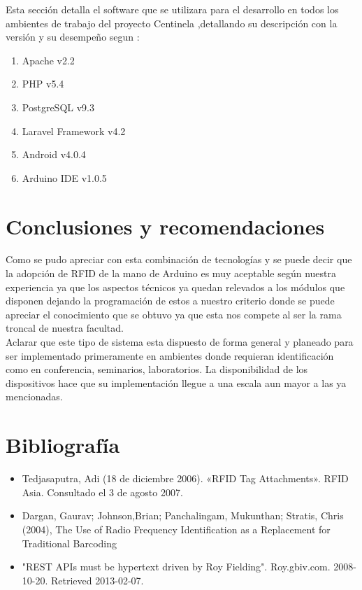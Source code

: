 \documentclass[11pt,twocolumn]{article}
\begin{document}
	Esta secci\'on detalla el software que se utilizara para el desarrollo en todos los ambientes de trabajo del proyecto Centinela ,detallando su descripci\'on con la versi\'on y su desempe\~no segun :
	
	\begin{enumerate}
		\item Apache v2.2
		\item PHP v5.4
		\item PostgreSQL v9.3
		\item Laravel Framework v4.2
		\item Android v4.0.4
		\item Arduino IDE v1.0.5
	\end{enumerate}

\section{Conclusiones y recomendaciones}
Como se pudo apreciar con esta combinaci\'on de tecnolog\'ias y se puede decir que la adopci\'on de RFID de la mano de Arduino es muy aceptable seg\'un nuestra experiencia ya que los  aspectos t\'ecnicos ya quedan relevados a los m\'odulos que disponen dejando la programaci\'on de estos a nuestro criterio donde se puede apreciar el conocimiento que se obtuvo ya que esta nos compete al ser la rama troncal de nuestra facultad. \\
	
Aclarar que este tipo de sistema esta dispuesto de forma general y planeado para ser implementado primeramente en ambientes donde requieran identificaci\'on como en conferencia, seminarios, laboratorios. La disponibilidad de los dispositivos hace que su implementaci\'on llegue a una escala aun mayor a las ya mencionadas.
\section{Bibliograf\'ia}
	
	\begin{itemize}
		\item  Tedjasaputra, Adi (18 de diciembre 2006). «RFID Tag Attachments». RFID Asia. Consultado el 3 de agosto 2007.
		\item Dargan, Gaurav; Johnson,Brian; Panchalingam, Mukunthan; Stratis, Chris (2004), The Use of Radio Frequency Identification as a Replacement for Traditional Barcoding
		
		\item "REST APIs must be hypertext driven by Roy Fielding". Roy.gbiv.com. 2008-10-20. Retrieved 2013-02-07.
	\end{itemize}
	
	
	
\end{document}
